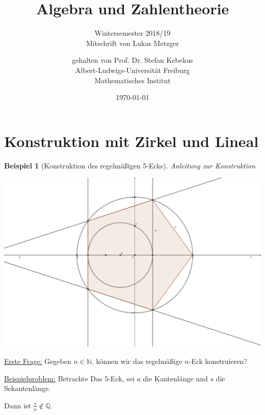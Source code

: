 \documentclass[a4paper,12pt,numbers=noenddot,parskip=full]{scrartcl}
\title{Algebra und Zahlentheorie}
\subtitle{Wintersemester 2018/19 \\ Mitschrift von Lukas Metzger}
\author{gehalten von Prof. Dr. Stefan Kebekus \\ Albert-Ludwigs-Universität Freiburg \\ Mathematisches Institut}
\date{\today}
\newcommand{\setN}{\mathbb{N}}
\newcommand{\setQ}{\mathbb{Q}}
\newcommand{\heading}{\underline}
\theoremstyle{dotless}
\newtheorem{example}[theorem]{Beispiel}
\theoremstyle{remark}
\begin{document}
	\pagestyle{headings}
\begin{titlepage}
	\maketitle	
	\thispagestyle{empty}
\end{titlepage}
\newpage 
\thispagestyle{empty}
\quad 
\newpage
\tableofcontents 
\thispagestyle{empty}

\newpage
\setcounter{page}{1}
	
	\setcounter{section}{-1}
	\section{Konstruktion mit Zirkel und Lineal}
	
	\begin{example}[Konstruktion des regelmäßigen 5-Ecks]
		Anleitung zur Konstruktion
		\begin{center}
			\includegraphics[width=0.8\linewidth]{bilder/bild1.png}
		\end{center}
	\end{example}

	\heading{Erste Frage:} Gegeben $n \in \setN$, können wir das regelmäßige $n$-Eck konstruieren?
	
	\heading{Beispielproblem:} Betrachte Das $5$-Eck, sei $a$ die Kantenlänge und $s$ die Sekantenlänge.
	
	Dann ist $\frac{s}{a} \notin \setQ$.
	
\end{document}
